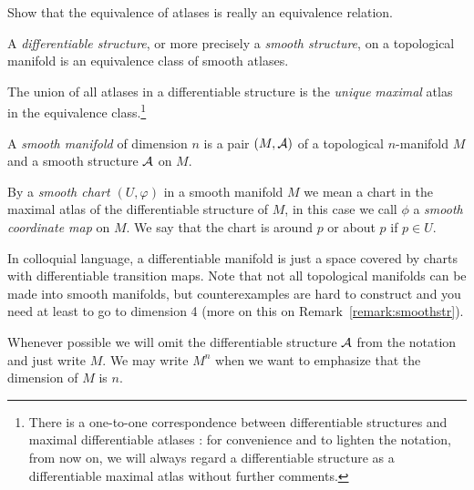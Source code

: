 \begin{exercise}
	Show that the equivalence of atlases is really an equivalence relation.
\end{exercise}

\begin{definition}\label{def:diffstr}
	A \emph{differentiable structure}, or more precisely a \emph{smooth structure}, on a topological manifold is an equivalence class of smooth atlases.
\end{definition}

\begin{remark}
	The union of all atlases in a differentiable structure is the \emph{unique} \emph{maximal} atlas in the equivalence class.\footnote{There is a one-to-one correspondence between differentiable structures and maximal differentiable atlases \cite[Proposition 1.17]{book:lee}: for convenience and to lighten the notation, from now on, we will always regard a differentiable structure as a differentiable maximal atlas without further comments.}
\end{remark}

\begin{definition}\label{def:diffmanifold}
	A \emph{smooth manifold} of dimension $n$ is a pair $(M, \mathcal{A})$ of a topological $n$-manifold $M$ and a smooth structure $\mathcal{A}$ on $M$.
\end{definition}

\begin{notation}
	By a \emph{smooth chart $(U, \varphi)$} in a smooth manifold $M$ we mean a chart in the maximal atlas of the differentiable structure of $M$, in this case we call $\phi$ a \emph{smooth coordinate map} on $M$. We say that the chart is around $p$ or about $p$ if $p\in U$.
\end{notation}

In colloquial language, a differentiable manifold is just a space covered by charts with differentiable transition maps.
Note that not all topological manifolds can be made into smooth manifolds, but counterexamples are hard to construct and you need at least to go to dimension 4 (more on this on Remark~\ref{remark:smoothstr}).

\begin{notation}
	Whenever possible we will omit the differentiable structure $\mathcal{A}$ from the notation and just write $M$.
	We may write $M^n$ when we want to emphasize that the dimension of $M$ is $n$.
\end{notation}

